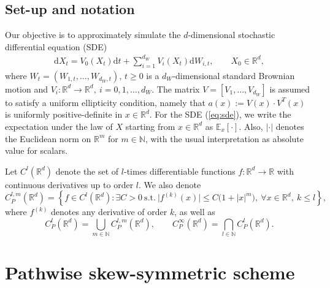 \documentclass[11pt]{article}
\renewcommand{\d}{\mathrm{d}}
\begin{document}
\subsection{Set-up and notation}\label{sec:notation}
Our objective is to approximately simulate the $d$-dimensional stochastic differential equation (SDE)
% 
\begin{align} \label{eq:sde}
\d X_t =  
V_{0} (X_t) \d t 
+ \sum_{i = 1}^{d_W} V_{i} (X_t)  \d W_{i, t}, \qquad  X_0 \in \mathbb{R}^d,
\end{align} 
% 
where $W_t = (W_{1, t}, \ldots, W_{d_W, t}), \, t \ge 0$ is a $d_W$-dimensional standard Brownian motion and $V_{i}: \mathbb{R}^{d} \to \mathbb{R}^{d}, \ i = 0, 1, \ldots, d_W$. 
The matrix $V=[V_1,\ldots,V_{d_W}]$ is assumed to satisfy a uniform ellipticity condition, namely that $a(x):=V(x) \cdot V^T(x)$ is uniformly positive-definite in $x\in\mathbb R^d$.  
For the SDE (\ref{eq:sde}), we write the expectation under the law of $X$ starting from $x \in \mathbb{R}^d$ as $\mathbb{E}_x [\cdot]$. Also, $|\cdot|$ denotes the Euclidean norm on $\mathbb{R}^m$ for $m \in \mathbb{N}$, with the usual interpretation as absolute value for scalars.

Let $C^l(\mathbb{R}^d)$ denote the set of $l$-times differentiable functions
$f:\mathbb{R}^d \to \mathbb{R}$ with continuous derivatives up to order $l$.
We also denote
\[
C_P^{l,m}(\mathbb{R}^d)
=
\left\{
f \in C^l(\mathbb{R}^d)
:
\exists C>0 \ \text{s.t.} \ 
\lvert f^{(k)}(x)\rvert
\le C\bigl(1+|x|^m\bigr),
\ \forall x\in\mathbb{R}^d,\ k\le l
\right\},
\]
where $f^{(k)}$ denotes any derivative of order $k$, as well as
\[
C_P^l(\mathbb{R}^d)
=
\bigcup_{m\in\mathbb{N}} C_P^{l,m}(\mathbb{R}^d),
\qquad
C_P^\infty(\mathbb{R}^d)
=
\bigcap_{l\in\mathbb{N}} C_P^l(\mathbb{R}^d).
\]
% 

\section{Pathwise skew-symmetric scheme}
\label{sec:main}
\end{document}
